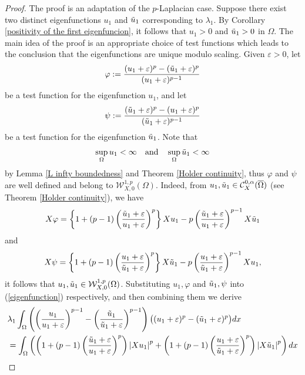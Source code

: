 \documentclass[a4paper,12pt,reqno]{amsart}
\renewcommand\eqref[1]{(\ref{#1})} %
\numberwithin{equation}{section}
\theoremstyle{plain}
\theoremstyle{definition}
\begin{document}
\begin{proof}
The proof is an adaptation of the $p$-Laplacian case. Suppose there exist two distinct eigenfunctions $u_{1}$ and $\Tilde{u}_{1}$ corresponding to $\lambda_{1}$. By Corollary \ref{positivity of the first eigenfuncion}, it follows that $u_{1}>0$ and $\Tilde{u}_{1}>0$ in $\Omega$. The main idea of the proof is an appropriate choice of test functions which leads to the conclusion that the eigenfunctions are unique modulo scaling. Given $\varepsilon>0$, let
\begin{equation*}
\varphi:=\frac{(u_{1}+\varepsilon)^{p}-(\Tilde{u}_{1}+\varepsilon)^{p}}{(u_{1}+\varepsilon)^{p-1}} 
\end{equation*}
be a test function for the eigenfunction $u_{1}$, and let
\begin{equation*}
\psi:=\frac{(\Tilde{u}_{1}+\varepsilon)^{p}-(u_{1}+\varepsilon)^{p}}{(\Tilde{u}_{1}+\varepsilon)^{p-1}}
\end{equation*}
be a test function for the eigenfunction $\Tilde{u}_{1}$. Note that 
$$\sup_{\Omega}u_{1}<\infty \quad \text{and}\quad\sup_{\Omega}\Tilde{u}_{1}<\infty$$
by Lemma \ref{L infty boundedness}  and Theorem \ref{Holder continuity}, thus $\varphi$ and $\psi$ are well defined and belong to $\mathcal{W}_{X,0}^{1, p}(\Omega)$. Indeed, from $u_{1},\Tilde{u}_{1}\in\mathcal{C}^{0, \alpha}_{X}(\overline{\Omega})$ (see Theorem \ref{Holder continuity}), we have
$$
X \varphi=\left\{1+(p-1)\left(\frac{\Tilde{u}_{1}+\varepsilon}{u_{1}+\varepsilon}\right)^p\right\} X u_{1}-p\left(\frac{\Tilde{u}_{1}+\varepsilon}{u_{1}+\varepsilon}\right)^{p-1} X \Tilde{u}_{1}
$$
and
$$
X \psi=\left\{1+(p-1)\left(\frac{u_{1}+\varepsilon}{\Tilde{u}_{1}+\varepsilon}\right)^p\right\} X \Tilde{u}_{1}-p\left(\frac{u_{1}+\varepsilon}{\Tilde{u}_{1}+\varepsilon}\right)^{p-1} X u_{1},
$$
it follows that $u_{1}, \Tilde{u}_{1}\in \mathcal{W}_{X,0}^{1, p}(\Omega)$. Substituting  $u_{1},\varphi$ and $\Tilde{u}_{1},\psi$ into  \eqref{eigenfunction} respectively, and then combining them we derive
\begin{equation}\label{long calculation}
\begin{aligned}
&\lambda_{1}\int_{\Omega}\left(\left(\frac{u_{1}}{u_{1}+\varepsilon}\right)^{p-1}-\left(\frac{\Tilde{u}_{1}}{\Tilde{u}_{1}+\varepsilon}\right)^{p-1}\right)\big((u_{1}+\varepsilon)^{p}-(\Tilde{u}_{1}+\varepsilon)^{p}\big) d x\\
&= \int_{\Omega}\left(\left(1+(p-1)\left(\frac{\Tilde{u}_{1}+\varepsilon}{u_{1}+\varepsilon}\right)^{p}\right)\left|X u_{1}\right|^{p}+\left(1+(p-1)\left(\frac{u_{1}+\varepsilon}{\Tilde{u}_{1}+\varepsilon}\right)^{p}\right)\left|X \Tilde{u}_{1}\right|^{p}\right) d x \\

\end{aligned}
\end{equation}
\end{proof}
\end{document}
